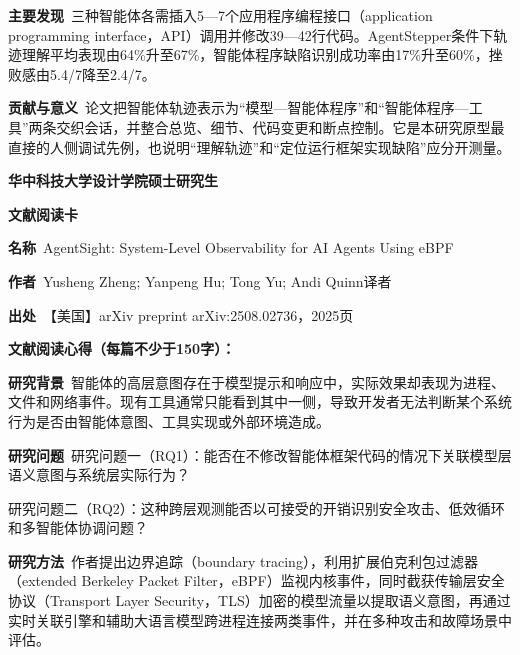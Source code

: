 \noindent\textbf{主要发现}\ 三种智能体各需插入5—7个应用程序编程接口（application programming interface，API）调用并修改39—42行代码。AgentStepper条件下轨迹理解平均表现由64\%升至67\%，智能体程序缺陷识别成功率由17\%升至60\%，挫败感由5.4/7降至2.4/7。\par
\noindent\textbf{贡献与意义}\ 论文把智能体轨迹表示为“模型—智能体程序”和“智能体程序—工具”两条交织会话，并整合总览、细节、代码变更和断点控制。它是本研究原型最直接的人侧调试先例，也说明“理解轨迹”和“定位运行框架实现缺陷”应分开测量。\par
\clearpage
\begin{center}
{\songti\bfseries\fontsize{18.5pt}{27.75pt}\selectfont 华中科技大学设计学院硕士研究生\par}
{\songti\bfseries\fontsize{18.5pt}{27.75pt}\selectfont 文献阅读卡\par}
\end{center}
\vspace{0.25em}
\noindent\underline{}\par
\vspace{0.35em}
\noindent\textbf{名称}\ AgentSight: System-Level Observability for AI Agents Using eBPF\par
\noindent\textbf{作者}\ Yusheng Zheng; Yanpeng Hu; Tong Yu; Andi Quinn\quad 译者\par
\noindent\textbf{出处}\ 【美国】arXiv preprint arXiv:2508.02736，2025\quad 页\par
\vspace{0.35em}
\noindent\textbf{文献阅读心得（每篇不少于150字）：}\par
\noindent\textbf{研究背景}\ 智能体的高层意图存在于模型提示和响应中，实际效果却表现为进程、文件和网络事件。现有工具通常只能看到其中一侧，导致开发者无法判断某个系统行为是否由智能体意图、工具实现或外部环境造成。\par
\noindent\textbf{研究问题}\ 研究问题一（RQ1）：能否在不修改智能体框架代码的情况下关联模型层语义意图与系统层实际行为？\par
研究问题二（RQ2）：这种跨层观测能否以可接受的开销识别安全攻击、低效循环和多智能体协调问题？\par
\noindent\textbf{研究方法}\ 作者提出边界追踪（boundary tracing），利用扩展伯克利包过滤器（extended Berkeley Packet Filter，eBPF）监视内核事件，同时截获传输层安全协议（Transport Layer Security，TLS）加密的模型流量以提取语义意图，再通过实时关联引擎和辅助大语言模型跨进程连接两类事件，并在多种攻击和故障场景中评估。\par
